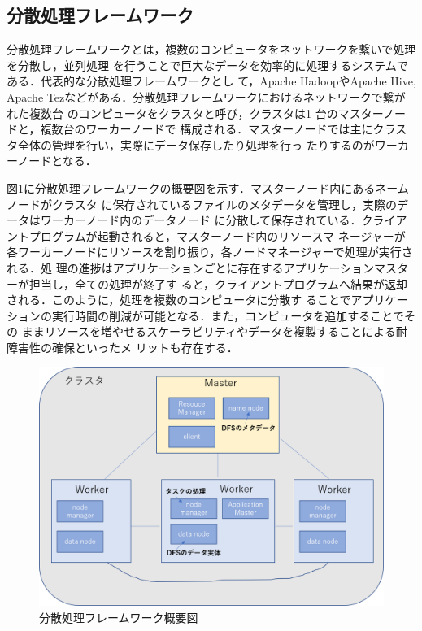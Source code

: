 \subsection{分散処理フレームワーク}
分散処理フレームワークとは，複数のコンピュータをネットワークを繋いで処理を分散し，並列処理
を行うことで巨大なデータを効率的に処理するシステムである．代表的な分散処理フレームワークとし
て，Apache Hadoop\cite{hadoop}やApache Hive\cite{hive}, Apache Tez\cite{tez}などがある．分散処理フレームワークにおけるネットワークで繋がれた複数台
のコンピュータをクラスタと呼び，クラスタは1 台のマスターノードと，複数台のワーカーノードで
構成される．マスターノードでは主にクラスタ全体の管理を行い，実際にデータ保存したり処理を行っ
たりするのがワーカーノードとなる．

図\ref{fig:ditributed-processing-system}に分散処理フレームワークの概要図を示す．マスターノード内にあるネームノードがクラスタ
に保存されているファイルのメタデータを管理し，実際のデータはワーカーノード内のデータノード
に分散して保存されている．クライアントプログラムが起動されると，マスターノード内のリソースマ
ネージャーが各ワーカーノードにリソースを割り振り，各ノードマネージャーで処理が実行される．処
理の進捗はアプリケーションごとに存在するアプリケーションマスターが担当し，全ての処理が終了す
ると，クライアントプログラムへ結果が返却される．このように，処理を複数のコンピュータに分散す
ることでアプリケーションの実行時間の削減が可能となる．また，コンピュータを追加することでその
ままリソースを増やせるスケーラビリティやデータを複製することによる耐障害性の確保といったメ
リットも存在する．

\begin{figure}
  \centering
  \includegraphics[scale=0.3]{figures/distributed-processing-system.png}
  \caption{分散処理フレームワーク概要図}
  \label{fig:ditributed-processing-system}
\end{figure}

